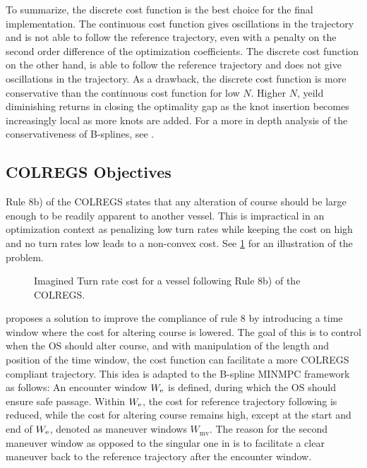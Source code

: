 \FloatBarrier
To summarize, the discrete cost function is the best choice for the final implementation. The continuous cost function gives oscillations in the trajectory and is not able to follow the reference trajectory, even with a penalty on the second order difference of the optimization coefficients. The discrete cost function on the other hand, is able to follow the reference trajectory and does not give oscillations in the trajectory. As a drawback, the discrete cost function is more conservative than the continuous cost function for low $N$. Higher $N$, yeild diminishing returns in closing the optimality gap as the knot insertion becomes increasingly local as more knots are added.
For a more in depth analysis of the conservativeness of B-splines, see \citet{Grimstad2016}.


\subsection{COLREGS Objectives}
Rule 8b) of the COLREGS states that any alteration of course should be large enough to be readily apparent to another vessel. This is impractical in an optimization context as penalizing low turn rates while keeping the cost on high and no turn rates low leads to a non-convex cost. See \cref{fig:turn-rate-cost} for an illustration of the problem. 

\begin{figure}
    \centering
    
    \caption{Imagined Turn rate cost for a vessel following Rule 8b) of the COLREGS.}
    \label{fig:turn-rate-cost}
\end{figure}

\cite{Thyri2022-MPC} proposes a solution to improve the compliance of rule 8 by introducing a time window where the cost for altering course is lowered. The goal of this is to control when the OS should alter course, and with manipulation of the length and position of the time window, the cost function can facilitate a more COLREGS compliant trajectory. This idea is adapted to the B-spline MINMPC framework as follows:
An encounter window $W_\text e$ is defined, during which the OS should ensure safe passage. Within $W_\text e$, the cost for reference trajectory following is reduced, while the cost for altering course remains high, except at the start and end of $W_\text e$, denoted as maneuver windows $W_\text{mv}$. 
The reason for the second maneuver window as opposed to the singular one in \cite{Thyri2022-MPC} is to facilitate a clear maneuver back to the reference trajectory after the encounter window.

